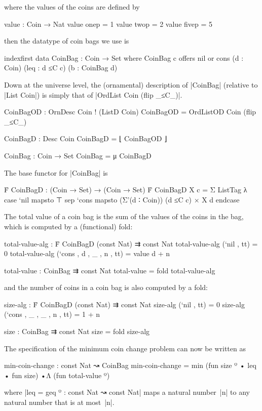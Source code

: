 where the values of the coins are defined by
\begin{code}
value : Coin → Nat
value  onep   =  1
value  twop   =  2
value  fivep  =  5
\end{code}
then the datatype of coin bags we use is
\begin{code}
indexfirst data CoinBag : Coin → Set where
  CoinBag c  offers  nil
             or      cons  (d : Coin) (leq : d ≤C c) (b : CoinBag d)
\end{code}
Down at the universe level, the (ornamental) description of |CoinBag| (relative to |List Coin|) is simply that of |OrdList Coin (flip _≤C_)|.
\begin{code}
CoinBagOD : OrnDesc Coin ! (ListD Coin)
CoinBagOD = OrdListOD Coin (flip _≤C_)

CoinBagD : Desc Coin
CoinBagD = ⌊ CoinBagOD ⌋

CoinBag : Coin → Set
CoinBag = μ CoinBagD
\end{code}
The base functor for |CoinBag| is
\begin{code}
Ḟ CoinBagD : (Coin → Set) → (Coin → Set)
Ḟ CoinBagD X c = Σ ListTag λ  case  `nil   mapsto ⊤
                              sep   `cons  mapsto (Σ'(d ∶ Coin)) (d ≤C c) × X d endcase
\end{code}
The total value of a coin bag is the sum of the values of the coins in the bag, which is computed by a (functional) fold:
\begin{code}
total-value-alg : Ḟ CoinBagD (const Nat) ⇉ const Nat
total-value-alg (`nil   ,              tt) = 0
total-value-alg (`cons  , d , _ , n ,  tt) = value d + n

total-value : CoinBag ⇉ const Nat
total-value = fold total-value-alg
\end{code}
and the number of coins in a coin bag is also computed by a fold:
\begin{code}
size-alg : Ḟ CoinBagD (const Nat) ⇉ const Nat
size-alg (`nil   ,              tt) = 0
size-alg (`cons  , _ , _ , n ,  tt) = 1 + n

size : CoinBag ⇉ const Nat
size = fold size-alg
\end{code}
The specification of the minimum coin change problem can now be written as
\begin{code}
min-coin-change : const Nat ↝ CoinBag
min-coin-change = min (fun size º • leq • fun size) •Λ (fun total-value º)
\end{code}
where |leq = geq º : const Nat ↝ const Nat| maps a natural number~|n| to any natural number that is at most~|n|.
